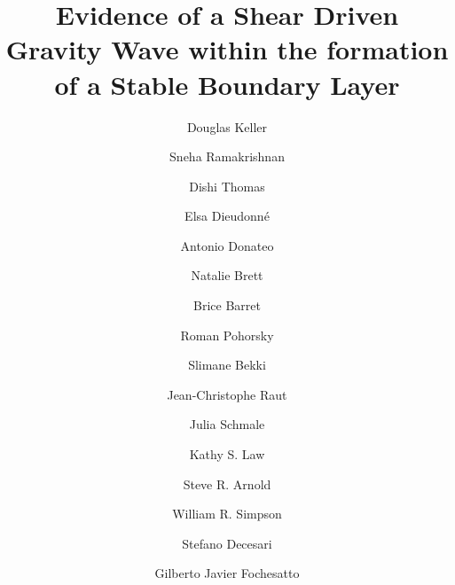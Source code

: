 \documentclass[smallextended]{svjour3}
\begin{document}

\title{Evidence of a Shear Driven Gravity Wave within the formation of a Stable Boundary Layer}



\author{
Douglas Keller \and
Sneha Ramakrishnan \and
Dishi Thomas \and
Elsa Dieudonné \and
Antonio Donateo \and
Natalie Brett \and
Brice Barret \and
Roman Pohorsky \and
Slimane Bekki \and
Jean-Christophe Raut \and
Julia Schmale \and
Kathy S. Law \and
Steve R. Arnold \and
William R. Simpson \and
Stefano Decesari \and
Gilberto Javier Fochesatto
}
\end{document}
